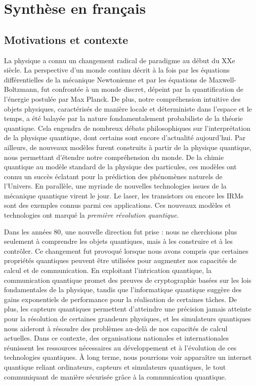 \chapter{Synthèse en français}

\section{Motivations et contexte}

La physique a connu un changement radical de paradigme au début du XXe siècle.
La perspective d'un monde continu décrit à la fois par les équations différentielles de la mécanique Newtonienne et par les équations de Maxwell-Boltzmann, fut confrontée à un monde discret, dépeint par la quantification de l'énergie postulée par Max Planck.
De plus, notre compréhension intuitive des objets physiques, caractérisés de manière locale et déterministe dans l'espace et le temps, a été balayée par la nature fondamentalement probabiliste de la théorie quantique.
Cela engendra de nombreux débats philosophiques sur l'interprétation de la physique quantique, dont certains sont encore d'actualité aujourd'hui.
Par ailleurs, de nouveaux modèles furent construits à partir de la physique quantique, nous permettant d'étendre notre compréhension du monde.
De la chimie quantique au modèle standard de la physique des particules, ces modèles ont connu un succès éclatant pour la prédiction des phénomènes naturels de l'Univers.
En parallèle, une myriade de nouvelles technologies issues de la mécanique quantique virent le jour.
Le laser, les transistors ou encore les IRMs sont des exemples connus parmi ces applications.
Ces nouveaux modèles et technologies ont marqué la \textit{première révolution quantique}.

\medbreak

Dans les années 80, une nouvelle direction fut prise : nous ne cherchions plus seulement à comprendre les objets quantiques, mais à les construire et à les contrôler.
Ce changement fut provoqué lorsque nous avons compris que certaines propriétés quantiques peuvent être utilisées pour augmenter nos capacités de calcul et de communication.
En exploitant l'intrication quantique, la communication quantique promet des preuves de cryptographie basées sur les lois fondamentales de la physique, tandis que l'informatique quantique suggère des gains exponentiels de performance pour la réalisation de certaines tâches.
De plus, les capteurs quantiques permettent d'atteindre une précision jamais atteinte pour la résolution de certaines grandeurs physiques, et les simulateurs quantiques nous aideront à résoudre des problèmes au-delà de nos capacités de calcul actuelles.
Dans ce contexte, des organisations nationales et internationales réunissent les ressources nécessaires au développement et à l'évolution de ces technologies quantiques.
À long terme, nous pourrions voir apparaître un internet quantique reliant ordinateurs, capteurs et simulateurs quantiques, le tout communiquant de manière sécurisée grâce à la communication quantique.

